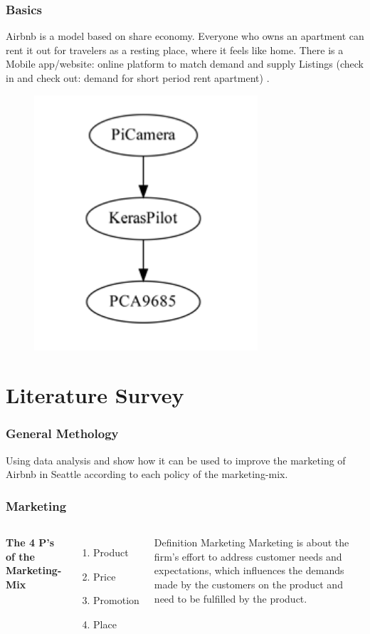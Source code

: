 \documentclass{beamer}
\begin{document}

\begin{frame}
\frametitle{Basics}
Airbnb is a model based on share economy. Everyone who owns an apartment can rent it out for travelers as a resting place, where it feels like home. There is a Mobile app/website: online platform to match demand and supply Listings (check in and check out: demand for short period rent apartment) .
\begin{figure}
\includegraphics[width=0.4\linewidth]{photo/autonom}
\end{figure}
\end{frame}

\section{Literature Survey}
\begin{frame}
\frametitle{General Methology}
Using data analysis and show how it can be used to improve the marketing of Airbnb in Seattle according to each policy of the marketing-mix.
\end{frame}
%
%
\begin{frame}
\frametitle{Marketing}
\begin{columns}[c] %

\textbf{The 4 P's of the Marketing-Mix}
\begin{enumerate}
\item Product
\item Price
\item Promotion
\item Place
\end{enumerate}


\begin{block}{Definition Marketing}
Marketing is about the firm’s effort to address customer needs and expectations, which influences the demands made by the customers on the product and need to be fulfilled by the product.
\end{block}
\end{columns}
\end{frame}
\end{document}
